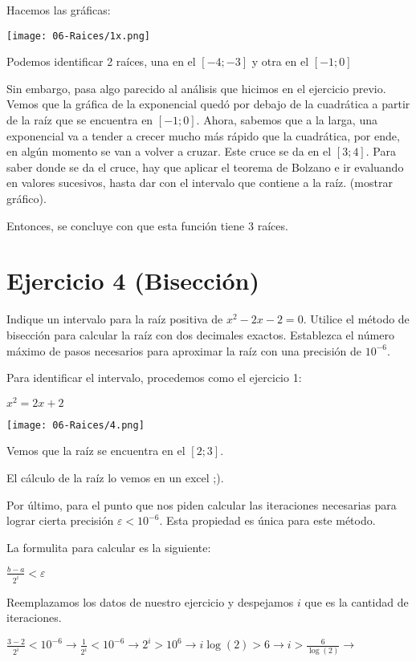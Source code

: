 \documentclass[11pt]{article}
\begin{document}
	Hacemos las gráficas:
	
	\texttt{[image: 06-Raices/1x.png]}
	
	Podemos identificar 2 raíces, una en el $[-4; -3]$ y otra en el $[-1; 0]$
	
	Sin embargo, pasa algo parecido al análisis que hicimos en el ejercicio previo. Vemos que la gráfica de la exponencial quedó por debajo de la cuadrática a partir de la raíz que se encuentra en $[-1; 0]$. Ahora, sabemos que a la larga, una exponencial va a tender a crecer mucho más rápido que la cuadrática, por ende, en algún momento se van a volver a cruzar. Este cruce se da en el $[3; 4]$. Para saber donde se da el cruce, hay que aplicar el teorema de Bolzano e ir evaluando en valores sucesivos, hasta dar con el intervalo que contiene a la raíz. (mostrar gráfico).
	
	Entonces, se concluye con que esta función tiene 3 raíces.
	
	\section{Ejercicio 4 (Bisección)}
	Indique un intervalo para la raíz positiva de $x^2-2x-2=0$. Utilice el método de bisección para calcular la raíz con dos decimales exactos. Establezca el número máximo de pasos necesarios para aproximar la raíz con una precisión de $10^{-6}$.
	
	Para identificar el intervalo, procedemos como el ejercicio 1:
	
	$x^2=2x+2$
	
	\texttt{[image: 06-Raices/4.png]}
	
	Vemos que la raíz se encuentra en el $[2; 3]$.
	
	El cálculo de la raíz lo vemos en un excel ;).
	
	Por último, para el punto que nos piden calcular las iteraciones necesarias para lograr cierta precisión $\varepsilon <10^{-6}$. Esta propiedad es única para este método.
	
	La formulita para calcular es la siguiente:
	
	$\displaystyle \frac{b-a}{2^{i}}<\varepsilon$
	
	Reemplazamos los datos de nuestro ejercicio y despejamos $i$ que es la cantidad de iteraciones.
	
	$\displaystyle \frac{3-2}{2^{i}}<10^{-6} \rightarrow \frac{1}{2^i} <10^{-6} \rightarrow 2^i > 10^6 \rightarrow i\log(2)>6 \rightarrow i > \frac{6}{\log(2)} \rightarrow $ 
	
\end{document}
